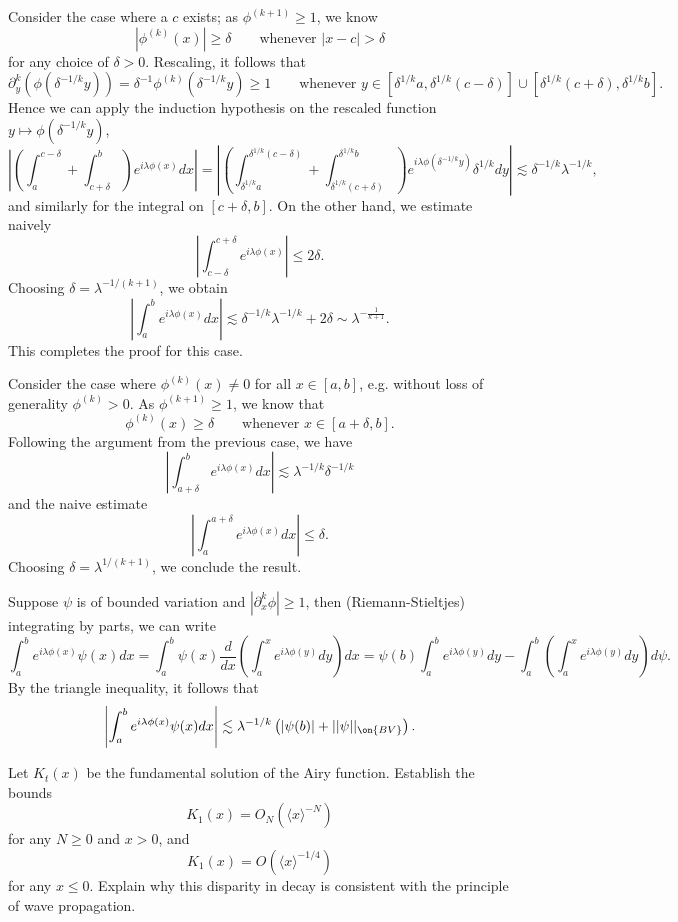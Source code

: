 \begin{solution}
Consider the case where a $c$ exists; as $\phi^{(k + 1)} \geq 1$, we know 
	\[ |\phi^{(k)} (x)| \geq \delta \qquad \text{whenever } |x - c| > \delta \]
for any choice of $\delta > 0$. Rescaling, it follows that
	\[  \partial_y^k (\phi(\delta^{-1/k}y)) = \delta^{-1} \phi^{(k)} (\delta^{-1/k} y) \geq 1 \qquad \text{whenever } y \in [\delta^{1/k} a, \delta^{1/k} (c - \delta)] \cup [\delta^{1/k} (c + \delta), \delta^{1/k} b]. \]
Hence we can apply the induction hypothesis on the rescaled function $y \mapsto \phi(\delta^{-1/k} y)$,
	\[ \left| \left( \int_a^{c - \delta} + \int_{c + \delta}^b \right) e^{i \lambda \phi(x)} dx \right| = \left| \left( \int_{\delta^{1/k}a}^{\delta^{1/k}(c - \delta)} +\int_{\delta^{1/k}(c + \delta)}^{\delta^{1/k}b} \right) e^{i \lambda \phi(\delta^{-1/k}y)} \delta^{1/k} dy \right| \lesssim \delta^{-1/k} \lambda^{-1/k}, \]
and similarly for the integral on $[c + \delta, b]$. On the other hand, we estimate naively 
	\[ \left| \int_{c - \delta}^{c + \delta} e^{i \lambda \phi(x)} \right| \leq 2 \delta. \]
Choosing $\delta = \lambda^{-1/(k + 1)}$, we obtain
	\[ \left| \int_a^b e^{i \lambda \phi(x)}  dx \right| \lesssim \delta^{-1/k} \lambda^{-1/k} + 2 \delta \sim \lambda^{- \frac{1}{k + 1}}. \]	
This completes the proof for this case. 	

Consider the case where $\phi^{(k)} (x) \neq 0$	for all $x \in [a, b]$, e.g. without loss of generality $\phi^{(k)} > 0$. As $\phi^{(k + 1)} \geq 1$, we know that 
	\[ \phi^{(k)} (x) \geq \delta \qquad \text{whenever } x \in [a + \delta, b]. \]
Following the argument from the previous case, we have
	\[ \left| \int_{a + \delta}^b e^{i \lambda \phi(x)} dx \right|  \lesssim \lambda^{-1/k} \delta^{-1/k}\]
and the naive estimate
	\[ \left| \int_a^{a + \delta} e^{i \lambda \phi(x)} dx \right| \leq \delta. \]	
Choosing $\delta = \lambda^{1/(k + 1)}$, we conclude the result. 	

Suppose $\psi$ is of bounded variation and $|\partial_x^k \phi| \geq 1$, then (Riemann-Stieltjes) integrating by parts, we can write
	\[\int_a^b e^{i \lambda \phi(x)} \psi(x) dx = \int_a^b \psi(x) \frac{d}{dx} \left( \int_a^x e^{i \lambda \phi(y)} dy\right) dx = \psi(b) \int_a^b e^{i \lambda \phi(y)} dy - \int_a^b \left( \int_a^x e^{i \lambda \phi(y)} dy \right) d \psi. \]
By the triangle inequality, it follows that 
	\[ \left|\int_a^b e^{i \lambda \phi(x)} \psi(x) dx\right| \lesssim \lambda^{-1/k} \left( |\psi(b)| + ||\psi||_{\on{BV}} \right).\]
\end{solution}

\begin{statement}
	Let $K_t (x)$ be the fundamental solution of the Airy function. Establish the bounds 
		\[ K_1 (x) = O_N (\langle x \rangle^{-N})\]
	for any $N \geq 0$ and $x > 0$, and 
		\[ K_1 (x) = O(\langle x \rangle^{-1/4}) \]
	for any $x \leq 0$. Explain why this disparity in decay is consistent with the principle of wave propagation. 	
\end{statement}

